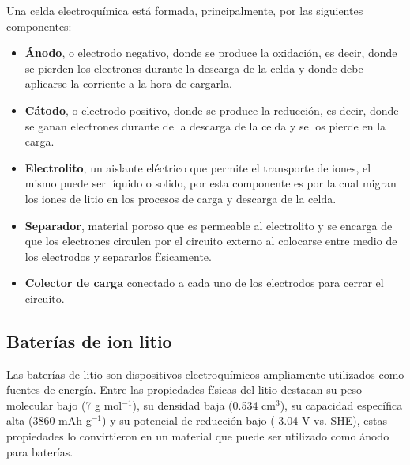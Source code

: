 Una celda electroquímica está formada, principalmente, por las siguientes 
componentes:
\begin{itemize}
    \item \textbf{Ánodo}, o electrodo negativo, donde se produce la oxidación,
        es decir, donde se pierden los electrones durante la descarga de la 
        celda y donde debe aplicarse la corriente a la hora de cargarla.
    \item \textbf{Cátodo}, o electrodo positivo, donde se produce la reducción,
        es decir, donde se ganan electrones durante de la descarga de la celda y
        se los pierde en la carga.
    \item \textbf{Electrolito}, un aislante eléctrico que permite el transporte 
        de iones, el mismo puede ser líquido o solido, por esta componente es 
        por la cual migran los iones de litio en los procesos de carga y descarga
        de la celda.
    \item \textbf{Separador}, material poroso que es permeable al electrolito y
        se encarga de que los electrones circulen por el circuito externo al 
        colocarse entre medio de los electrodos y separarlos físicamente.
    \item \textbf{Colector de carga} conectado a cada uno de los electrodos para
        cerrar el circuito.
\end{itemize}

\subsection{Baterías de ion litio}

Las baterías de litio son dispositivos electroquímicos ampliamente utilizados 
como fuentes de energía. Entre las propiedades físicas del litio destacan su 
peso molecular bajo (7 g mol$^{-1}$), su densidad baja (0.534 cm$^3$), su 
capacidad específica alta (3860 mAh g$^{-1}$) y su potencial de reducción bajo 
(-3.04 V vs. SHE), estas propiedades lo convirtieron en un material que puede 
ser utilizado como ánodo para baterías. 

